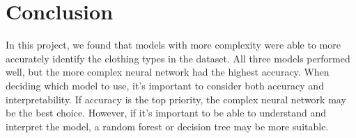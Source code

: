 \section{Conclusion}
In this project, we found that models with more complexity were able to more accurately identify the clothing types in the dataset.
All three models performed well, but the more complex neural network had the highest accuracy.
When deciding which model to use, it's important to consider both accuracy and interpretability.
If accuracy is the top priority, the complex neural network may be the best choice.
However, if it's important to be able to understand and interpret the model, a random forest or decision tree may be more suitable.
